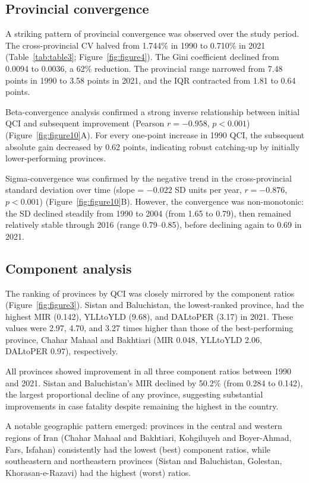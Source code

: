 \documentclass[12pt]{article}
\begin{document}
\subsection{Provincial convergence}

A striking pattern of provincial convergence was observed over the study period. The cross-provincial CV halved from 1.744\% in 1990 to 0.710\% in 2021 (Table~\ref{tab:table3}; Figure~\ref{fig:figure4}). The Gini coefficient declined from 0.0094 to 0.0036, a 62\% reduction. The provincial range narrowed from 7.48 points in 1990 to 3.58 points in 2021, and the IQR contracted from 1.81 to 0.64 points.

Beta-convergence analysis confirmed a strong inverse relationship between initial QCI and subsequent improvement (Pearson $r = -0.958$, $p < 0.001$) (Figure~\ref{fig:figure10}A). For every one-point increase in 1990 QCI, the subsequent absolute gain decreased by 0.62 points, indicating robust catching-up by initially lower-performing provinces.

Sigma-convergence was confirmed by the negative trend in the cross-provincial standard deviation over time (slope = $-0.022$ SD units per year, $r = -0.876$, $p < 0.001$) (Figure~\ref{fig:figure10}B). However, the convergence was non-monotonic: the SD declined steadily from 1990 to 2004 (from 1.65 to 0.79), then remained relatively stable through 2016 (range 0.79--0.85), before declining again to 0.69 in 2021.

\subsection{Component analysis}

The ranking of provinces by QCI was closely mirrored by the component ratios (Figure~\ref{fig:figure3}). Sistan and Baluchistan, the lowest-ranked province, had the highest MIR (0.142), YLLtoYLD (9.68), and DALtoPER (3.17) in 2021. These values were 2.97, 4.70, and 3.27 times higher than those of the best-performing province, Chahar Mahaal and Bakhtiari (MIR 0.048, YLLtoYLD 2.06, DALtoPER 0.97), respectively.

All provinces showed improvement in all three component ratios between 1990 and 2021. Sistan and Baluchistan's MIR declined by 50.2\% (from 0.284 to 0.142), the largest proportional decline of any province, suggesting substantial improvements in case fatality despite remaining the highest in the country.

A notable geographic pattern emerged: provinces in the central and western regions of Iran (Chahar Mahaal and Bakhtiari, Kohgiluyeh and Boyer-Ahmad, Fars, Isfahan) consistently had the lowest (best) component ratios, while southeastern and northeastern provinces (Sistan and Baluchistan, Golestan, Khorasan-e-Razavi) had the highest (worst) ratios.
\end{document}
